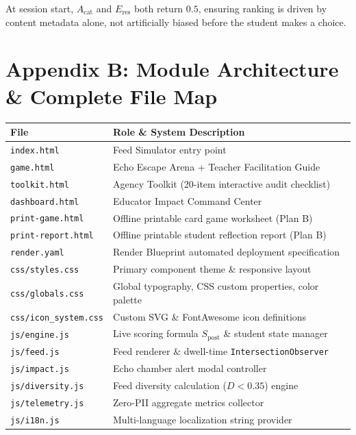 \documentclass[11pt, a4paper]{article}
\begin{document}
At session start, $A_{\text{cat}}$ and $E_{\text{res}}$ both return $0.5$, ensuring ranking is driven by content metadata alone, not artificially biased before the student makes a choice.

\section*{Appendix B: Module Architecture \& Complete File Map}

\begin{center}
\renewcommand{\arraystretch}{1.25}
\begin{tabular}{ll}
\toprule
\textbf{File} & \textbf{Role \& System Description} \\
\midrule
\texttt{index.html}      & Feed Simulator entry point \\
\texttt{game.html}       & Echo Escape Arena + Teacher Facilitation Guide \\
\texttt{toolkit.html}    & Agency Toolkit (20-item interactive audit checklist) \\
\texttt{dashboard.html}  & Educator Impact Command Center \\
\texttt{print-game.html} & Offline printable card game worksheet (Plan B) \\
\texttt{print-report.html}& Offline printable student reflection report (Plan B) \\
\texttt{render.yaml}     & Render Blueprint automated deployment specification \\
\midrule
\texttt{css/styles.css}  & Primary component theme \& responsive layout \\
\texttt{css/globals.css} & Global typography, CSS custom properties, color palette \\
\texttt{css/icon\_system.css} & Custom SVG \& FontAwesome icon definitions \\
\midrule
\texttt{js/engine.js}    & Live scoring formula $S_{\text{post}}$ \& student state manager \\
\texttt{js/feed.js}      & Feed renderer \& dwell-time \texttt{IntersectionObserver} \\
\texttt{js/impact.js}    & Echo chamber alert modal controller \\
\texttt{js/diversity.js} & Feed diversity calculation ($D < 0.35$) engine \\
\texttt{js/telemetry.js} & Zero-PII aggregate metrics collector \\
\texttt{js/i18n.js}      & Multi-language localization string provider \\
\bottomrule
\end{tabular}
\end{center}
\end{document}

